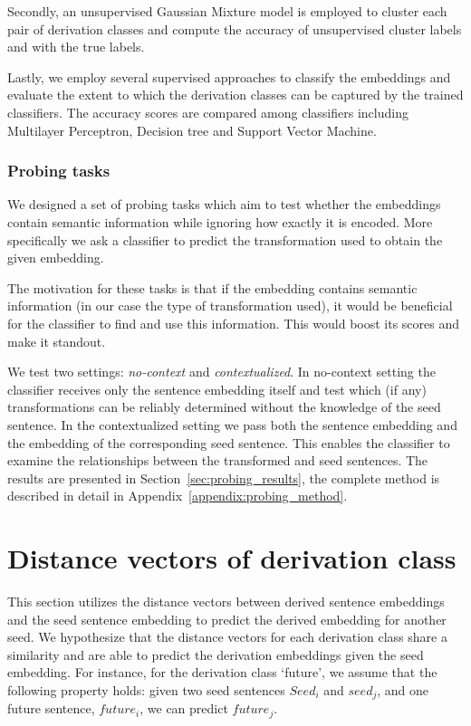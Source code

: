 \documentclass[11pt]{article}
\begin{document}
Secondly, an unsupervised Gaussian Mixture model is employed to cluster each pair of derivation classes and compute the accuracy of unsupervised cluster labels and with the true labels.

Lastly, we employ several supervised approaches to classify the embeddings and evaluate the extent to which the derivation classes can be captured by the trained classifiers. The accuracy scores are compared among classifiers including Multilayer Perceptron, Decision tree and Support Vector Machine.


\subsubsection{Probing tasks}

We designed a set of probing tasks which aim to test whether the embeddings
contain semantic information while ignoring how exactly it is encoded. More
specifically we ask a classifier to predict the transformation used to obtain
the given embedding.

The motivation for these tasks is that if the embedding contains semantic
information (in our case the type of transformation used), it would be
beneficial for the classifier to find and use this information. This would
boost its scores and make it standout.

We test two settings: \emph{no-context} and \emph{contextualized}. In
no-context setting the classifier receives only the sentence embedding itself
and test which (if any) transformations can be reliably determined without the
knowledge of the seed sentence. In the contextualized setting we pass both the
sentence embedding and the embedding of the corresponding seed sentence. This
enables the classifier to examine the relationships between the transformed and
seed sentences. The results are presented in Section~\ref{sec:probing_results},
the complete method is described in detail in
Appendix~\ref{appendix:probing_method}.

\section{Distance vectors of derivation class}

This section utilizes the distance vectors between derived sentence embeddings and the seed sentence embedding to predict the derived embedding for another seed. We hypothesize that the distance vectors for each derivation class share a similarity and are able to predict the derivation embeddings given the seed embedding. For instance, for the derivation class `future', we assume that the following property holds: given two seed sentences  $Seed_i$ and $seed_j$, and one future sentence, $future_i$, we can predict $future_j$.
 
\end{document}
